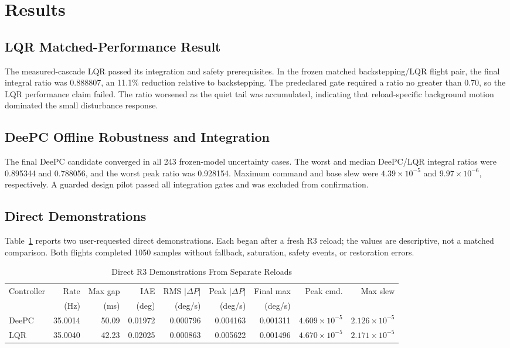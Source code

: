\documentclass[conference]{IEEEtran}
\begin{document}
\section{Results}
\subsection{LQR Matched-Performance Result}
The measured-cascade LQR passed its integration and safety prerequisites. In
the frozen matched backstepping/LQR flight pair, the final integral ratio was
0.888807, an 11.1\% reduction relative to backstepping. The predeclared gate
required a ratio no greater than 0.70, so the LQR performance claim failed. The
ratio worsened as the quiet tail was accumulated, indicating that
reload-specific background motion dominated the small disturbance response.

\subsection{DeePC Offline Robustness and Integration}
The final DeePC candidate converged in all 243 frozen-model uncertainty cases.
The worst and median DeePC/LQR integral ratios were 0.895344 and 0.788056, and
the worst peak ratio was 0.928154. Maximum command and base slew were
$4.39\times10^{-5}$ and $9.97\times10^{-6}$, respectively. A guarded design
pilot passed all integration gates and was excluded from confirmation.

\subsection{Direct Demonstrations}
Table~\ref{tab:direct} reports two user-requested direct demonstrations. Each
began after a fresh R3 reload; the values are descriptive, not a matched
comparison. Both flights completed 1050 samples without fallback, saturation,
safety events, or restoration errors.

\begin{table}[t]
\caption{Direct R3 Demonstrations From Separate Reloads}
\label{tab:direct}
\centering
\begin{tabular}{@{}lrrrrrrrr@{}}
\toprule
Controller & Rate & Max gap & IAE & RMS $|\Delta P|$ & Peak $|\Delta P|$ & Final max & Peak cmd. & Max slew \\
 & (Hz) & (ms) & (deg) & (deg/s) & (deg/s) & (deg/s) & & \\
\midrule
DeePC & 35.0014 & 50.09 & 0.01972 & 0.000796 & 0.004163 & 0.001311 & $4.609\!\times\!10^{-5}$ & $2.126\!\times\!10^{-5}$ \\
LQR   & 35.0040 & 42.23 & 0.02025 & 0.000863 & 0.005622 & 0.001496 & $4.670\!\times\!10^{-5}$ & $2.171\!\times\!10^{-5}$ \\
\bottomrule
\end{tabular}
\end{table}
\end{document}
